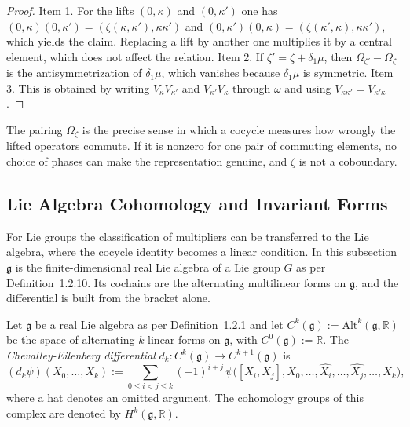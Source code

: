 \begin{proof}
	Item 1. For the lifts $(0,\kappa)$ and $(0,\kappa')$ one has $(0,\kappa)(0,\kappa')=(\zeta(\kappa,\kappa'),\kappa\kappa')$ and $(0,\kappa')(0,\kappa)=(\zeta(\kappa',\kappa),\kappa\kappa')$, which yields the claim. Replacing a lift by another one multiplies it by a central element, which does not affect the relation. Item 2. If $\zeta'=\zeta+\delta_1\mu$, then $\Omega_{\zeta'}-\Omega_\zeta$ is the antisymmetrization of $\delta_1\mu$, which vanishes because $\delta_1\mu$ is symmetric. Item 3. This is obtained by writing $V_\kappa V_{\kappa'}$ and $V_{\kappa'}V_\kappa$ through $\omega$ and using $V_{\kappa\kappa'}=V_{\kappa'\kappa}$.
\end{proof}

\noindent The pairing $\Omega_\zeta$ is the precise sense in which a cocycle measures how wrongly the lifted operators commute. If it is nonzero for one pair of commuting elements, no choice of phases can make the representation genuine, and $\zeta$ is not a coboundary.

\subsection{Lie Algebra Cohomology and Invariant Forms}\label{subsec:lie-cohomology}

For Lie groups the classification of multipliers can be transferred to the Lie algebra, where the cocycle identity becomes a linear condition. In this subsection $\mathfrak{g}$ is the finite-dimensional real Lie algebra of a Lie group $G$ as per Definition~1.2.10. Its cochains are the alternating multilinear forms on $\mathfrak{g}$, and the differential is built from the bracket alone.

\begin{definition}\label{def:lie-cohomology-group}
	Let $\mathfrak{g}$ be a real Lie algebra as per Definition~1.2.1 and let $C^k(\mathfrak{g}):=\mathrm{Alt}^k(\mathfrak{g},\mathbb{R})$ be the space of alternating $k$-linear forms on $\mathfrak{g}$, with $C^0(\mathfrak{g}):=\mathbb{R}$. The \emph{Chevalley-Eilenberg differential} $d_k:C^k(\mathfrak{g})\to C^{k+1}(\mathfrak{g})$ is
	\begin{equation*}
		(d_k\psi)(X_0,\dots,X_k):=\sum_{0\leq i<j\leq k}(-1)^{i+j}\,\psi\big([X_i,X_j],X_0,\dots,\widehat{X_i},\dots,\widehat{X_j},\dots,X_k\big),
	\end{equation*}
	where a hat denotes an omitted argument. The cohomology groups of this complex are denoted by $H^k(\mathfrak{g},\mathbb{R})$.
\end{definition}

